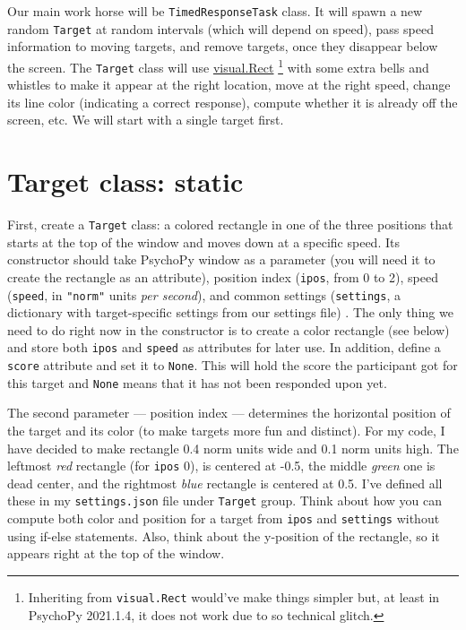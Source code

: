 \documentclass[
]{book}
\begin{document}
Our main work horse will be \texttt{TimedResponseTask} class. It will spawn a new random \texttt{Target} at random intervals (which will depend on speed), pass speed information to moving targets, and remove targets, once they disappear below the screen. The \texttt{Target} class will use \href{https://psychopy.org/api/visual/rect.html\#psychopy.visual.rect.Rect}{visual.Rect}
\footnote{Inheriting from \texttt{visual.Rect} would've make things simpler but, at least in PsychoPy 2021.1.4, it does not work due to so technical glitch.} with some extra bells and whistles to make it appear at the right location, move at the right speed, change its line color (indicating a correct response), compute whether it is already off the screen, etc. We will start with a single target first.

\hypertarget{target-class-static}{%
\section{Target class: static}\label{target-class-static}}

First, create a \texttt{Target} class: a colored rectangle in one of the three positions that starts at the top of the window and moves down at a specific speed. Its constructor should take PsychoPy window as a parameter (you will need it to create the rectangle as an attribute), position index (\texttt{ipos}, from 0 to 2), speed (\texttt{speed}, in \texttt{"norm"} units \emph{per second}), and common settings (\texttt{settings}, a dictionary with target-specific settings from our settings file) . The only thing we need to do right now in the constructor is to create a color rectangle (see below) and store both \texttt{ipos} and \texttt{speed} as attributes for later use. In addition, define a \texttt{score} attribute and set it to \texttt{None}. This will hold the score the participant got for this target and \texttt{None} means that it has not been responded upon yet.

The second parameter --- position index --- determines the horizontal position of the target and its color (to make targets more fun and distinct). For my code, I have decided to make rectangle 0.4 norm units wide and 0.1 norm units high. The leftmost \emph{red} rectangle (for \texttt{ipos} 0), is centered at -0.5, the middle \emph{green} one is dead center, and the rightmost \emph{blue} rectangle is centered at 0.5. I've defined all these in my \texttt{settings.json} file under \texttt{Target} group. Think about how you can compute both color and position for a target from \texttt{ipos} and \texttt{settings} without using if-else statements. Also, think about the y-position of the rectangle, so it appears right at the top of the window.
\end{document}
